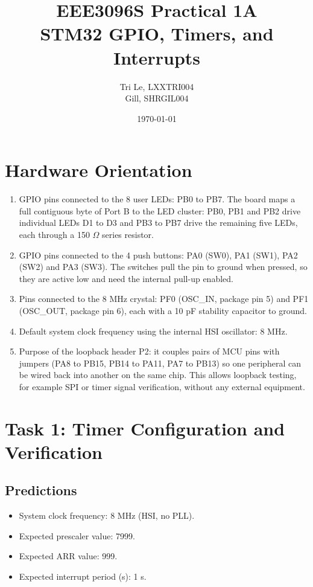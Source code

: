 \documentclass[11pt]{article}
\title{\textbf{EEE3096S Practical 1A} \\ STM32 GPIO, Timers, and Interrupts}
\author{Tri Le, LXXTRI004 \\ Gill, SHRGIL004}
\date{\today}
\begin{document}
\maketitle

\section{Hardware Orientation}

\begin{enumerate}
    \item GPIO pins connected to the 8 user LEDs: PB0 to PB7. The board maps a full contiguous byte of Port B to the LED cluster: PB0, PB1 and PB2 drive individual LEDs D1 to D3 and PB3 to PB7 drive the remaining five LEDs, each through a 150 $\Omega$ series resistor.
    \item GPIO pins connected to the 4 push buttons: PA0 (SW0), PA1 (SW1), PA2 (SW2) and PA3 (SW3). The switches pull the pin to ground when pressed, so they are active low and need the internal pull-up enabled.
    \item Pins connected to the 8 MHz crystal: PF0 (OSC\_IN, package pin 5) and PF1 (OSC\_OUT, package pin 6), each with a 10 pF stability capacitor to ground.
    \item Default system clock frequency using the internal HSI oscillator: 8 MHz.
    \item Purpose of the loopback header P2: it couples pairs of MCU pins with jumpers (PA8 to PB15, PB14 to PA11, PA7 to PB13) so one peripheral can be wired back into another on the same chip. This allows loopback testing, for example SPI or timer signal verification, without any external equipment.
\end{enumerate}

\section{Task 1: Timer Configuration and Verification}

\subsection{Predictions}

\begin{itemize}
    \item System clock frequency: 8 MHz (HSI, no PLL).
    \item Expected prescaler value: 7999.
    \item Expected ARR value: 999.
    \item Expected interrupt period (s): 1 s.
\end{itemize}
\end{document}
